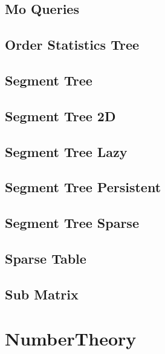 \subsection{Mo Queries}
\raggedbottom
\hrulefill
\subsection{Order Statistics Tree}
\raggedbottom
\hrulefill
\subsection{Segment Tree}
\raggedbottom
\hrulefill
\subsection{Segment Tree 2D}
\raggedbottom
\hrulefill
\subsection{Segment Tree Lazy}
\raggedbottom
\hrulefill
\subsection{Segment Tree Persistent}
\raggedbottom
\hrulefill
\subsection{Segment Tree Sparse}
\raggedbottom
\hrulefill
\subsection{Sparse Table}
\raggedbottom
\hrulefill
\subsection{Sub Matrix}
\raggedbottom
\hrulefill
\newpage

\section{NumberTheory}
